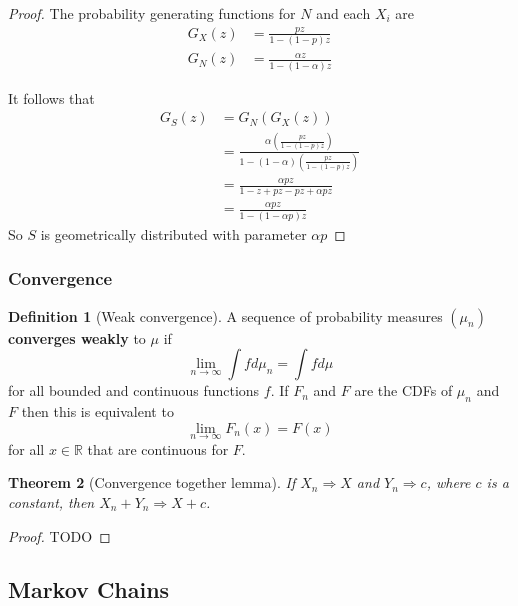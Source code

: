 \documentclass{article}
\theoremstyle{plain}
\newtheorem{theorem}{Theorem}[section]
\theoremstyle{definition}
\newtheorem{defn}[theorem]{Definition}
\theoremstyle{remark}
\numberwithin{equation}{section}
\newcommand{\R}{\mathbb{R}}
\begin{document}
\begin{proof}
The probability generating functions for $N$ and each $X_i$ are
\begin{align*}
    G_X(z) &= \frac{p z}{1 - (1 - p)z}\\
    G_{N}(z) &= \frac{\alpha z}{1 - (1 - \alpha)z}
\end{align*}

It follows that
\begin{align*}
    G_S(z) &= G_N(G_X(z))\\
    &= \frac{
    \alpha \left( \frac{p z}{1 - (1 - p)z} \right)
    }{
        1 - (1 - \alpha) \left( \frac{p z}{1 - (1 - p)z} \right)
    }\\
    &= \frac{
        \alpha p z
    }{
        1 - z + pz - pz + \alpha p z
    } \\
    &= \frac{
        \alpha p z
    }{
        1 - (1 - \alpha p) z
    }
\end{align*}
So $S$ is geometrically distributed with parameter $\alpha p$
\end{proof}

\subsubsection{Convergence}

\begin{defn}[Weak convergence]
A sequence of probability measures $(\mu_n)$ \textbf{converges weakly} to $\mu$ if
$$
\lim_{n \to \infty} \int f d\mu_n = \int f d\mu
$$
for all bounded and continuous functions $f$.
If $F_n$ and $F$ are the CDFs of $\mu_n$ and $F$ then this is equivalent to
$$
\lim_{n \to \infty} F_n(x) = F(x)
$$
for all $x \in \R$ that are continuous for $F$.
\end{defn}

\begin{theorem}[Convergence together lemma] \label{thm:conv_together_lemma}
If $X_n \Rightarrow X$ and $Y_n \Rightarrow c$, where $c$ is a constant, then $X_n + Y_n \Rightarrow X + c$.
\end{theorem}

\begin{proof}
TODO

\end{proof}

\subsection{Markov Chains}
\end{document}
